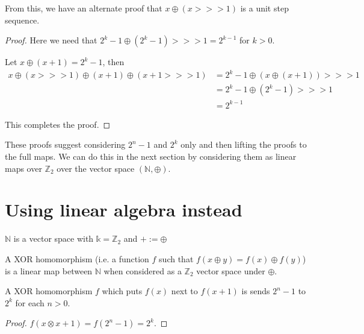 \begin{theorem}
    \label{thm:alternate_direct_gray_code_proof}
    \leanok
    From this, we have an alternate proof that $x \oplus (x >>> 1)$ is a unit step sequence.
\end{theorem}

\begin{proof}
    \leanok
    Here we need that $2^k - 1 \oplus (2^k - 1) >>> 1 = 2^{k-1}$ for $k > 0$.

    Let $x \oplus (x+1) = 2^k - 1$, then
    \begin{align*}
        x \oplus (x >>> 1) \oplus (x + 1) \oplus (x + 1 >>> 1)
        &= 2^k - 1 \oplus (x \oplus (x+1)) >>> 1 \\
        &= 2^k - 1 \oplus (2^k - 1) >>> 1 \\
        &= 2^{k - 1}
    \end{align*}

    This completes the proof.
\end{proof}

These proofs suggest considering $2^n - 1$ and $2^k$ only and then lifting the proofs to the full maps.
We can do this in the next section by considering them as linear maps over $\mathbb{Z}_2$ over the vector
space $(\mathbb{N}, \oplus)$.

\chapter{Using linear algebra instead}

\begin{definition}
    \label{def:natural_numbers_vector_space}
    $\mathbb{N}$ is a vector space with $\mathbb{k} = \mathbb{Z}_2$ and $+ := \oplus$

    A XOR homomorphism (i.e. a function $f$ such that $f(x \oplus y) = f(x) \oplus f(y)$) is
    a linear map between $\mathbb{N}$ when considered as a $\mathbb{Z}_2$ vector space under $\oplus$.
\end{definition}

\begin{lemma}
    \label{thm:next_to_xor_homo_two_pow}
    A XOR homomorphism $f$ which puts $f(x)$ next to $f(x + 1)$ is sends $2^n - 1$ to $2^k$
    for each $n > 0$.
\end{lemma}

\begin{proof}
    $f(x \otimes x + 1) = f(2^n - 1) = 2^k$.
\end{proof}

